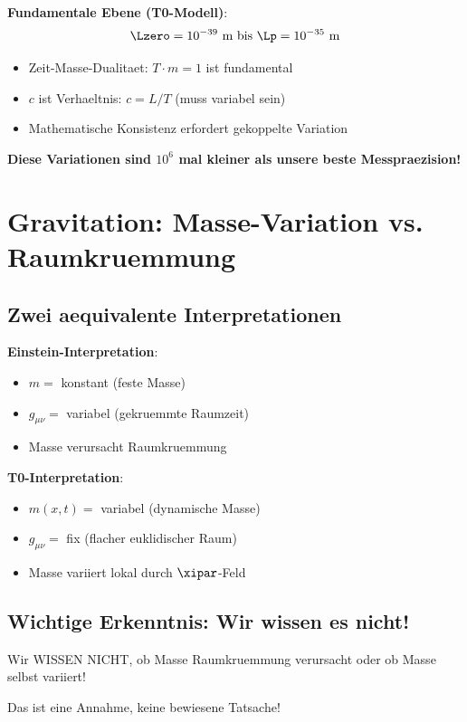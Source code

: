 	\textbf{Fundamentale Ebene (T0-Modell)}:
	\begin{equation}
		\Lzero = 10^{-39} \text{ m bis } \Lp = 10^{-35} \text{ m}
	\end{equation}
	
	\begin{itemize}
		\item Zeit-Masse-Dualitaet: $T \cdot m = 1$ ist fundamental
		\item $c$ ist Verhaeltnis: $c = L/T$ (muss variabel sein)
		\item Mathematische Konsistenz erfordert gekoppelte Variation
	\end{itemize}
	
	\textbf{Diese Variationen sind $10^6$ mal kleiner als unsere beste Messpraezision!}
	
	\section{Gravitation: Masse-Variation vs. Raumkruemmung}
	
	\subsection{Zwei aequivalente Interpretationen}
	
	\textbf{Einstein-Interpretation}:
	\begin{itemize}
		\item $m = $ konstant (feste Masse)
		\item $g_{\mu\nu} = $ variabel (gekruemmte Raumzeit)
		\item Masse verursacht Raumkruemmung
	\end{itemize}
	
	\textbf{T0-Interpretation}:
	\begin{itemize}
		\item $m(x,t) = $ variabel (dynamische Masse)
		\item $g_{\mu\nu} = $ fix (flacher euklidischer Raum)
		\item Masse variiert lokal durch $\xipar$-Feld
	\end{itemize}
	
	\subsection{Wichtige Erkenntnis: Wir wissen es nicht!}
	
	\begin{tcolorbox}[colback=red!5!white,colframe=red!75!black,title=Achtung - Fundamentaler Punkt]
		Wir WISSEN NICHT, ob Masse Raumkruemmung verursacht oder ob Masse selbst variiert!
		
		Das ist eine Annahme, keine bewiesene Tatsache!
	\end{tcolorbox}
	
